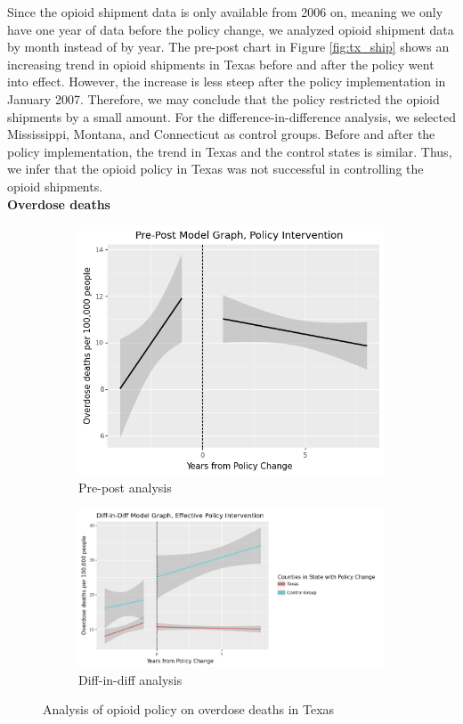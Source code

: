 \documentclass[12pt,letterpaper]{article}
\begin{document}
Since the opioid shipment data is only available from 2006 on, meaning we only have one year of data before the policy change, we analyzed opioid shipment data by month instead of by year. The pre-post chart in Figure \ref{fig:tx_ship} shows an increasing trend in opioid shipments in Texas before and after the policy went into effect. However, the increase is less steep after the policy implementation in January 2007. Therefore, we may conclude that the policy restricted the opioid shipments by a small amount. For the difference-in-difference analysis, we selected Mississippi, Montana, and Connecticut as control groups. Before and after the policy implementation, the trend in Texas and the control states is similar. Thus, we infer that the opioid policy in Texas was not successful in controlling the opioid shipments. \\

\noindent \textbf{Overdose deaths}

\begin{figure}[!h]
\centering
\begin{subfigure}{.5\textwidth}
  \centering
  \includegraphics[width=0.7\linewidth]{../30_results/General_Results/texas_overdose_death_prepost.png}
  \caption{Pre-post analysis}
  \label{fig:tx_death_prepost}
\end{subfigure}%
\begin{subfigure}{.55\textwidth}
  \centering
  \includegraphics[width=1\linewidth]{../30_results/General_Results/texas_overdose_death_diffdiff.png}
  \caption{Diff-in-diff analysis}
  \label{fig:tx_death_did}
\end{subfigure}
\caption{Analysis of opioid policy on overdose deaths in Texas}
\label{fig:tx_death}
\end{figure}
\end{document}
